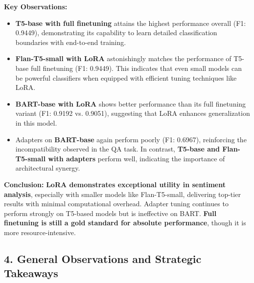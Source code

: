 \textbf{Key Observations:}
\begin{itemize}
    \item \textbf{T5-base with full finetuning} attains the highest performance overall (F1: 0.9449), demonstrating its capability to learn detailed classification boundaries with end-to-end training.
    
    \item \textbf{Flan-T5-small with LoRA} astonishingly matches the performance of T5-base full finetuning (F1: 0.9449). This indicates that even small models can be powerful classifiers when equipped with efficient tuning techniques like LoRA.
    
    \item \textbf{BART-base with LoRA} shows better performance than its full finetuning variant (F1: 0.9192 vs. 0.9051), suggesting that LoRA enhances generalization in this model.
    
    \item Adapters on \textbf{BART-base} again perform poorly (F1: 0.6967), reinforcing the incompatibility observed in the QA task. In contrast, \textbf{T5-base and Flan-T5-small with adapters} perform well, indicating the importance of architectural synergy.
\end{itemize}

\textbf{Conclusion:} 
\textbf{LoRA demonstrates exceptional utility in sentiment analysis}, especially with smaller models like Flan-T5-small, delivering top-tier results with minimal computational overhead. Adapter tuning continues to perform strongly on T5-based models but is ineffective on BART. \textbf{Full finetuning is still a gold standard for absolute performance}, though it is more resource-intensive.

\subsection*{4. General Observations and Strategic Takeaways}

